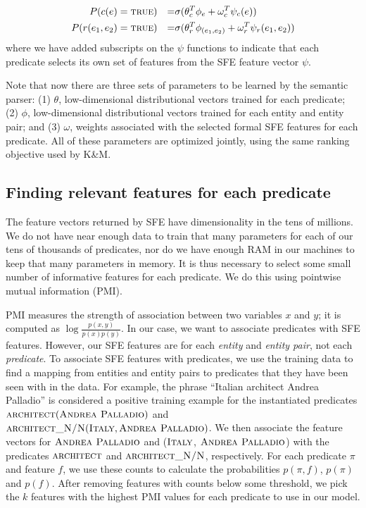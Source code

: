 \documentclass[11pt]{article}
\newcommand{\predicate}[1]{\ensuremath{\textsc{#1}}}
\newcommand{\entity}[1]{\ensuremath{\textsc{#1}}}
\newcommand{\true}[0]{\predicate{true}}
\begin{document}
\begin{align*}
  P(c(e) & = \true{}) & = & \sigma ( \theta_c^T \phi_e + \omega_c^T \psi_c(e)) \\
  P(r(e_1, e_2) & = \true{}) & = & \sigma ( \theta_r^T \phi_{(e_1, e_2)} + \omega_r^T \psi_r(e_1, e_2) )
\end{align*}
where we have added subscripts on the $\psi$ functions to indicate that each
predicate selects its own set of features from the SFE feature vector $\psi$.

Note that now there are three sets of parameters to be learned by the semantic
parser: (1) $\theta$, low-dimensional distributional vectors trained for each
predicate; (2) $\phi$, low-dimensional distributional vectors trained for each
entity and entity pair; and (3) $\omega$, weights associated with the selected
formal SFE features for each predicate.  All of these parameters are optimized
jointly, using the same ranking objective used by K\&M.

\subsection{Finding relevant features for each predicate}
\label{sec:computing-pmi}

The feature vectors returned by SFE have dimensionality in the tens of
millions.  We do not have near enough data to train that many parameters for
each of our tens of thousands of predicates, nor do we have enough RAM in our
machines to keep that many parameters in memory.  It is thus necessary to
select some small number of informative features for each predicate.  We do
this using pointwise mutual information (PMI).

PMI measures the strength of association between two variables $x$ and $y$; it
is computed as $\log\frac{p(x,y)}{p(x)p(y)}$.  In our case, we want to
associate predicates with SFE features.  However, our SFE features are for each
\emph{entity} and \emph{entity pair}, not each \emph{predicate}.  To associate
SFE features with predicates, we use the training data to find a mapping from
entities and entity pairs to predicates that they have been seen with in the
data.  For example, the phrase ``Italian architect Andrea Palladio'' is
considered a positive training example for the instantiated predicates
$\predicate{architect}(\entity{Andrea Palladio})$ and
$\predicate{architect\_N/N}(\entity{Italy}, \entity{Andrea Palladio})$.  We
then associate the feature vectors for \entity{Andrea Palladio} and
(\entity{Italy}, \entity{Andrea Palladio}) with the predicates
\predicate{architect} and \predicate{architect\_N/N}, respectively.  For each
predicate $\pi$ and feature $f$, we use these counts to calculate the
probabilities $p(\pi, f)$, $p(\pi)$ and $p(f)$.  After removing features with
counts below some threshold, we pick the $k$ features with the highest PMI
values for each predicate to use in our model.
\end{document}
